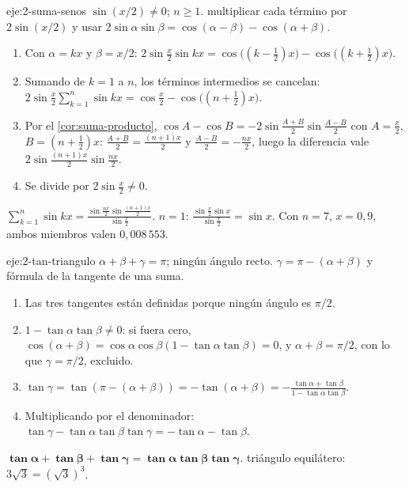 \begin{solucion}{eje:2-suma-senos}
\datos $\sin(x/2)\ne0$; $n\ge1$.
\planteamiento multiplicar cada término por $2\sin(x/2)$ y usar $2\sin\alpha\sin\beta=\cos(\alpha-\beta)-\cos(\alpha+\beta)$.
\pasos
\begin{enumerate}[label=\arabic*.]
  \item Con $\alpha=kx$ y $\beta=x/2$: $2\sin\frac{x}{2}\sin kx=\cos\bigl((k-\tfrac12)x\bigr)-\cos\bigl((k+\tfrac12)x\bigr)$.
  \item Sumando de $k=1$ a $n$, los términos intermedios se cancelan: $2\sin\frac{x}{2}\sum_{k=1}^{n}\sin kx=\cos\frac{x}{2}-\cos\bigl((n+\tfrac12)x\bigr)$.
  \item Por el \cref{cor:suma-producto}, $\cos A-\cos B=-2\sin\frac{A+B}{2}\sin\frac{A-B}{2}$ con $A=\frac x2$, $B=(n+\frac12)x$: $\frac{A+B}{2}=\frac{(n+1)x}{2}$ y $\frac{A-B}{2}=-\frac{nx}{2}$, luego la diferencia vale $2\sin\frac{(n+1)x}{2}\sin\frac{nx}{2}$.
  \item Se divide por $2\sin\frac x2\ne0$.
\end{enumerate}
\resultado $\displaystyle\sum_{k=1}^{n}\sin kx=\frac{\sin\frac{nx}{2}\sin\frac{(n+1)x}{2}}{\sin\frac x2}$.
\comprobacion $n=1$: $\frac{\sin\frac x2\sin x}{\sin\frac x2}=\sin x$. Con $n=7$, $x=0{,}9$, ambos miembros valen $0{,}008\,553$.
\end{solucion}

\begin{solucion}{eje:2-tan-triangulo}
\datos $\alpha+\beta+\gamma=\pi$; ningún ángulo recto.
\planteamiento $\gamma=\pi-(\alpha+\beta)$ y fórmula de la tangente de una suma.
\pasos
\begin{enumerate}[label=\arabic*.]
  \item Las tres tangentes están definidas porque ningún ángulo es $\pi/2$.
  \item $1-\tan\alpha\tan\beta\ne0$: si fuera cero, $\cos(\alpha+\beta)=\cos\alpha\cos\beta(1-\tan\alpha\tan\beta)=0$, y $\alpha+\beta=\pi/2$, con lo que $\gamma=\pi/2$, excluido.
  \item $\tan\gamma=\tan(\pi-(\alpha+\beta))=-\tan(\alpha+\beta)=-\frac{\tan\alpha+\tan\beta}{1-\tan\alpha\tan\beta}$.
  \item Multiplicando por el denominador: $\tan\gamma-\tan\alpha\tan\beta\tan\gamma=-\tan\alpha-\tan\beta$.
\end{enumerate}
\resultado $\mathbf{\tan\alpha+\tan\beta+\tan\gamma=\tan\alpha\tan\beta\tan\gamma}$.
\comprobacion triángulo equilátero: $3\sqrt3=(\sqrt3)^{3}$.
\end{solucion}

